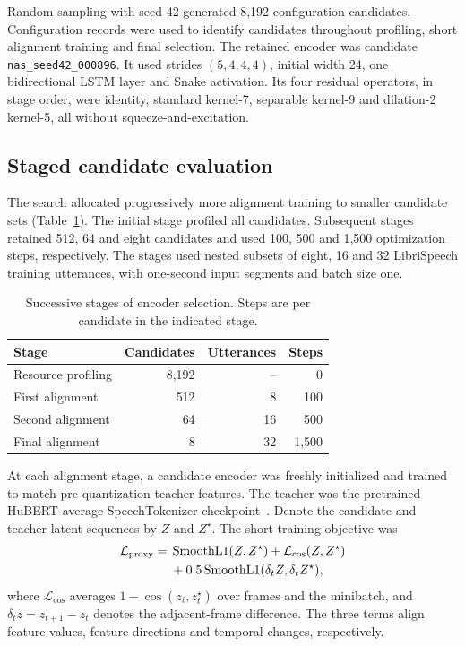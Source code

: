 Random sampling with seed 42 generated 8,192 configuration candidates. Configuration records were used to identify candidates throughout profiling, short alignment training and final selection. The retained encoder was candidate \texttt{nas\_seed42\_000896}. It used strides $(5,4,4,4)$, initial width 24, one bidirectional LSTM layer and Snake activation. Its four residual operators, in stage order, were identity, standard kernel-7, separable kernel-9 and dilation-2 kernel-5, all without squeeze-and-excitation.

\subsection{Staged candidate evaluation}
The search allocated progressively more alignment training to smaller candidate sets (Table~\ref{tab:sv2-search}). The initial stage profiled all candidates. Subsequent stages retained 512, 64 and eight candidates and used 100, 500 and 1,500 optimization steps, respectively. The stages used nested subsets of eight, 16 and 32 LibriSpeech training utterances, with one-second input segments and batch size one.

\begin{table}[t]
\centering
\caption{Successive stages of encoder selection. Steps are per candidate in the indicated stage.}
\label{tab:sv2-search}
\small
\begin{tabular}{@{}lrrr@{}}
\toprule
Stage & Candidates & Utterances & Steps\\
\midrule
Resource profiling & 8,192 & -- & 0\\
First alignment & 512 & 8 & 100\\
Second alignment & 64 & 16 & 500\\
Final alignment & 8 & 32 & 1,500\\
\bottomrule
\end{tabular}
\end{table}

At each alignment stage, a candidate encoder was freshly initialized and trained to match pre-quantization teacher features. The teacher was the pretrained HuBERT-average SpeechTokenizer checkpoint~\cite{speechtokenizer}. Denote the candidate and teacher latent sequences by $Z$ and $Z^\star$. The short-training objective was
\begin{equation}
\begin{split}
 \mathcal L_{\rm proxy}={}&
 \operatorname{SmoothL1}(Z,Z^\star)
 +\mathcal L_{\cos}(Z,Z^\star)\\
 &+0.5\operatorname{SmoothL1}
      (\delta_t Z,\delta_t Z^\star),
\end{split}
\label{eq:sv2-proxy}
\end{equation}
where $\mathcal L_{\cos}$ averages $1-\cos(z_t,z_t^\star)$ over frames and the minibatch, and $\delta_t z=z_{t+1}-z_t$ denotes the adjacent-frame difference. The three terms align feature values, feature directions and temporal changes, respectively.

